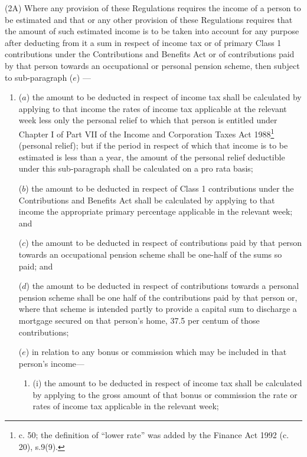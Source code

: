 \documentclass[a4paper]{article}
\begin{document}
(2A) Where any provision of these Regulations requires the income of a person to be estimated and that or any other provision of these Regulations requires that the amount of such estimated income is to be taken into account for any purpose after deducting from it a sum in respect of income tax or of primary Class 1 contributions under the Contributions and Benefits Act or of contributions paid by that person towards an occupational or personal pension scheme, then
subject to sub-paragraph ($e$)%
---
\begin{enumerate}\item[]
($a$) the amount to be deducted in respect of income tax shall be calculated by applying to that income the rates of income tax applicable at the 
relevant week  %
less only the personal relief to which that person is entitled under Chapter I of Part VII of the Income and Corporation Taxes Act 1988\footnote{ c. 50; the definition of “lower rate” was added by the Finance Act 1992 (c. 20), s.9(9).} (personal relief); but if the period in respect of which that income is to be estimated is less than a year, the amount of the personal relief deductible under this sub-paragraph shall be calculated on a pro rata basis;

($b$) the amount to be deducted in respect of Class 1 contributions under the Contributions and Benefits Act shall be calculated by applying to that income the appropriate primary percentage applicable in the relevant week; and

($c$) the amount to be deducted in respect of contributions paid by that person towards an occupational 
pension scheme shall be one-half of the sums so 
paid; and  %

($d$) the amount to be deducted in respect of contributions towards a personal pension scheme shall be one half of the contributions paid by that person or, where that scheme is intended partly to provide a capital sum to discharge a mortgage secured on that person’s home, 37.5 per centum of those contributions;

($e$) in relation to any bonus or commission which may be included in that person’s income—
\begin{enumerate}\item[]
(i) the amount to be deducted in respect of income tax shall be calculated by applying to the gross amount of that bonus or commission the rate or rates of income tax applicable in the relevant week;


\end{enumerate}
\end{enumerate}
\end{document}
